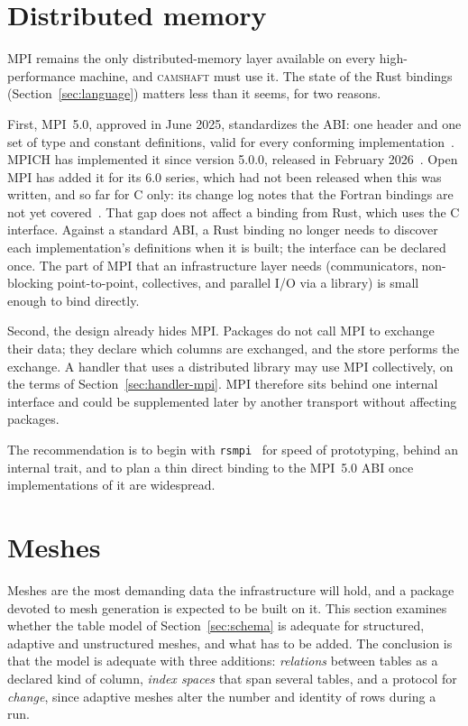 \documentclass[11pt,a4paper]{article}
\newcommand{\camshaft}{\textsc{camshaft}}
\newcommand{\code}[1]{\texttt{#1}}
\begin{document}
\section{Distributed memory}
\label{sec:mpi}

MPI remains the only distributed-memory layer available on every
high-performance machine, and \camshaft{} must use it.  The state of the Rust
bindings (Section~\ref{sec:language}) matters less than it seems, for two
reasons.

First, MPI~5.0, approved in June 2025, standardizes the ABI: one header and
one set of type and constant definitions, valid for every conforming
implementation~\cite{mpi50,mpiabi}.  MPICH has implemented it since version
5.0.0, released in February 2026~\cite{mpich5}.  Open MPI has added it for
its 6.0 series, which had not been released when this was written, and so
far for C only: its change log notes that the Fortran bindings are not yet
covered~\cite{ompi6}.  That gap does not affect a binding from Rust, which
uses the C interface.  Against a standard
ABI, a Rust binding no longer needs to discover each implementation's
definitions when it is built; the interface can be declared once.  The part of
MPI that an infrastructure layer needs (communicators, non-blocking
point-to-point, collectives, and parallel I/O via a library) is small enough
to bind directly.

Second, the design already hides MPI.  Packages do not call MPI to exchange
their data; they declare which columns are exchanged, and the store performs
the exchange.  A handler that uses a distributed library may use MPI
collectively, on the terms of Section~\ref{sec:handler-mpi}.  MPI
therefore sits behind one internal interface and could be supplemented later
by another transport without affecting packages.

The recommendation is to begin with \code{rsmpi}~\cite{rsmpi} for speed of
prototyping, behind an internal trait, and to plan a thin direct binding to
the MPI~5.0 ABI once implementations of it are widespread.

\section{Meshes}
\label{sec:mesh}

Meshes are the most demanding data the infrastructure will hold, and a
package devoted to mesh generation is expected to be built on it.  This
section examines whether the table model of Section~\ref{sec:schema} is
adequate for structured, adaptive and unstructured meshes, and what has to be
added.  The conclusion is that the model is adequate with three additions:
\emph{relations} between tables as a declared kind of column, \emph{index
spaces} that span several tables, and a protocol for \emph{change}, since
adaptive meshes alter the number and identity of rows during a run.
\end{document}
